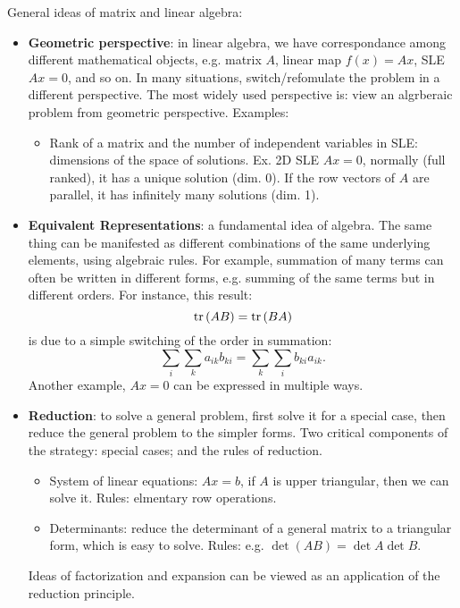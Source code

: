 \documentclass{report}
\begin{document}
General ideas of matrix and linear algebra: 
\begin{itemize}	
\item \textbf{Geometric perspective}: in linear algebra, we have correspondance among different mathematical objects, e.g. matrix $A$, linear map $f(x) = Ax$, SLE $Ax = 0$, and so on. In many situations, switch/refomulate the problem in a different perspective. The most widely used perspective is: view an algrberaic problem from geometric perspective. Examples:
\begin{itemize}
	\item Rank of a matrix and the number of independent variables in SLE: dimensions of the space of solutions. Ex. 2D SLE $Ax = 0$, normally (full ranked), it has a unique solution (dim. 0). If the row vectors of $A$ are parallel, it has infinitely many solutions (dim. 1). 
\end{itemize} 

\item \textbf{Equivalent Representations}: a fundamental idea of algebra. The same thing can be manifested as different combinations of the same underlying elements, using algebraic rules. For example, summation of many terms can often be written in different forms, e.g. summing of the same terms but in different orders. For instance, this result: 
\begin{equation}
{\rm tr}\,(AB) = {\rm tr}\,(BA)	
\end{equation}
is due to a simple switching of the order in summation: 
\begin{equation}
\sum_i \sum_k a_{ik} b_{ki} = \sum_k \sum_i b_{ki} a_{ik}.
\end{equation}
Another example, $Ax = 0$ can be expressed in multiple ways. 
	
\item \textbf{Reduction}: to solve a general problem, first solve it for a special case, then reduce the general problem to the simpler forms. Two critical components of the strategy: special cases; and the rules of reduction. 
\begin{itemize}
	\item System of linear equations: $Ax = b$, if $A$ is upper triangular, then we can solve it. Rules: elmentary row operations. 
	\item Determinants: reduce the determinant of a general matrix to a triangular form, which is easy to solve. Rules: e.g. $\det (AB) = \det A \det B$. 
\end{itemize} 	
Ideas of factorization and expansion can be viewed as an application of the reduction principle. 
	

\end{itemize}
\end{document}
